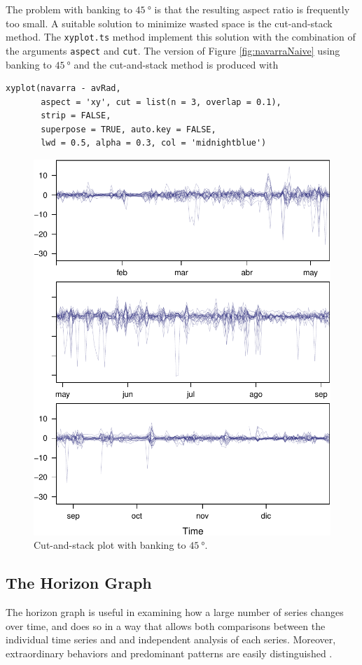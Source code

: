 \documentclass[smallroyalvopaper]{memoir}
\begin{document}
The problem with banking to \(\SI{45}{\degree}\) is that the resulting
aspect ratio is frequently too small. A suitable solution to
minimize wasted space is the cut-and-stack method. The \texttt{xyplot.ts}
method implement this solution with the combination of the
arguments \texttt{aspect} and \texttt{cut}. The version of Figure
\ref{fig:navarraNaive} using banking to \(\SI{45}{\degree}\) and the
cut-and-stack method is produced with
\lstset{language=r,label= ,caption= ,captionpos=b,numbers=none}
\begin{lstlisting}
xyplot(navarra - avRad,
       aspect = 'xy', cut = list(n = 3, overlap = 0.1),
       strip = FALSE,
       superpose = TRUE, auto.key = FALSE,
       lwd = 0.5, alpha = 0.3, col = 'midnightblue')
\end{lstlisting}

\begin{figure}[htbp]
\centering
\includegraphics[width=.9\linewidth]{figs/navarraBanking.pdf}
\caption{Cut-and-stack plot with banking to \(\SI{45}{\degree}\). \label{fig:navarraBanking}}
\end{figure}

\subsection{The Horizon Graph \label{sec:horizonplot}}
\label{sec:org6ed98e1}
The horizon graph is useful in examining how a large number of series
changes over time, and does so in a way that allows both comparisons
between the individual time series and and independent analysis of
each series. Moreover, extraordinary behaviors and predominant
patterns are easily distinguished \cite{Heer.Kong.ea2009,Few2008}.
\end{document}
